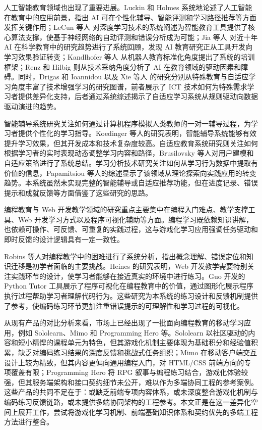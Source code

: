 人工智能教育领域也出现了重要进展。Luckin 和 Holmes\cite{luckin2016} 系统地论述了人工智能在教育中的应用前景，指出 AI 可在个性化辅导、智能评测和学习路径推荐等方面发挥关键作用；LeCun 等人\cite{lecun2015} 对深度学习技术的系统阐述为智能教育工具提供了核心算法支撑，使基于神经网络的自动评测和错误分析成为可能；Jia 等人\cite{jia2024} 对近十年 AI 在科学教育中的研究趋势进行了系统回顾，发现 AI 教育研究正从工具开发向学习效果验证转变；Kandlhofer 等人\cite{kandlhofer2021} 从机器人教育标准化角度提出了系统的培训框架；Renz 和 Hilbig\cite{renz2020} 则从技术采纳角度分析了 AI 在教育领域的驱动因素和障碍。同时，Drigas 和 Ioannidou\cite{drigas2013} 以及 Xie 等人\cite{xie2019} 的研究分别从特殊教育与自适应学习角度丰富了技术增强学习的研究图谱，前者展示了 ICT 技术如何为特殊需求学习者提供差异化支持，后者通过系统综述揭示了自适应学习系统从规则驱动向数据驱动演进的趋势\cite{koedinger1997,woolf2010,brusilovsky2007,papamitsiou2014}。

智能辅导系统研究关注如何通过计算机程序模拟人类教师的一对一辅导过程，为学习者提供个性化的学习指导。Koedinger 等人的研究表明，智能辅导系统能够有效提升学习效果，但其开发成本和技术复杂度较高。自适应教育系统研究则关注如何根据学习者的实时表现动态调整学习内容和路径，Brusilovsky 等人对用户建模和自适应策略进行了系统总结。学习分析技术研究关注如何从学习行为数据中提取有价值的信息，Papamitsiou 等人的综述显示了该领域从理论探索向实践应用的转变趋势。本系统虽然未实现完整的智能辅导或自适应推荐功能，但在进度记录、错误提示和成就反馈等方面借鉴了这些研究的思路。

编程教育与 Web 开发教学领域的研究重点主要集中在编程入门难点、教学支撑工具、Web 开发学习方式以及程序可视化辅助等方面。编程学习既依赖知识讲解，也依赖可操作、可反馈、可重复的实践过程，这与游戏化学习应用强调任务驱动和即时反馈的设计逻辑具有一定一致性\cite{robins2003,heines2001,guo2013}。

Robins 等人对编程教学中的困难进行了系统分析，指出概念理解、错误定位和知识迁移是初学者面临的主要挑战。Heines 的研究表明，Web 开发教学需要特别关注实践环节的设计，使学习者能够在接近真实的环境中进行练习。Guo 开发的 Python Tutor 工具展示了程序可视化在编程教育中的价值，通过图形化展示程序执行过程帮助学习者理解代码行为。这些研究为本系统的练习设计和反馈机制提供了参考，使编码练习环节更加注重错误提示的可理解性和学习过程的可视化。

从现有产品的对比分析来看，市场上已经出现了一批面向编程教育的移动学习应用，例如 Sololearn、Mimo 和 Programming Hero 等。Sololearn 以社区驱动的内容和短小精悍的课程单元为特色，但其游戏化机制主要体现为基础积分和经验值积累，缺乏对编码练习结果的深度反馈和挑战式任务组织；Mimo 在移动客户端交互设计上较为精致，但其内容更偏向通用编程入门，对 HTML/CSS 前端方向的专项覆盖有限；Programming Hero 将 RPG 叙事与编程练习结合，游戏化体验较强，但其服务端架构和接口契约细节未公开，难以作为多端协同工程的参考案例。这些产品的共同不足在于：或缺乏前端专项内容体系，或未深度整合游戏化机制与编码练习反馈链路，或未提供多端协同架构的工程参考。本文正是在这一差异化空间上展开工作，尝试将游戏化学习机制、前端基础知识体系和契约优先的多端工程方法进行整合。

